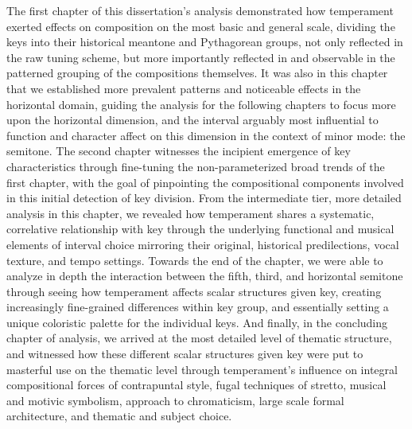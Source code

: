 The first chapter of this dissertation's analysis demonstrated how
temperament exerted effects on composition on the most basic and general
scale, dividing the keys into their historical meantone and Pythagorean
groups, not only reflected in the raw tuning scheme, but more
importantly reflected in and observable in the patterned grouping of the
compositions themselves. It was also in this chapter that we established
more prevalent patterns and noticeable effects in the horizontal domain,
guiding the analysis for the following chapters to focus more upon the
horizontal dimension, and the interval arguably most influential to
function and character affect on this dimension in the context of minor
mode: the semitone. The second chapter witnesses the incipient emergence
of key characteristics through fine-tuning the non-parameterized broad
trends of the first chapter, with the goal of pinpointing the
compositional components involved in this initial detection of key
division. From the intermediate tier, more detailed analysis in this
chapter, we revealed how temperament shares a systematic, correlative
relationship with key through the underlying functional and musical
elements of interval choice mirroring their original, historical
predilections, vocal texture, and tempo settings. Towards the end of the
chapter, we were able to analyze in depth the interaction between the
fifth, third, and horizontal semitone through seeing how temperament
affects scalar structures given key, creating increasingly fine-grained
differences within key group, and essentially setting a unique
coloristic palette for the individual keys. And finally, in the
concluding chapter of analysis, we arrived at the most detailed level of
thematic structure, and witnessed how these different scalar structures
given key were put to masterful use on the thematic level through
temperament's influence on integral compositional forces of contrapuntal
style, fugal techniques of stretto, musical and motivic symbolism,
approach to chromaticism, large scale formal architecture, and thematic
and subject choice.

